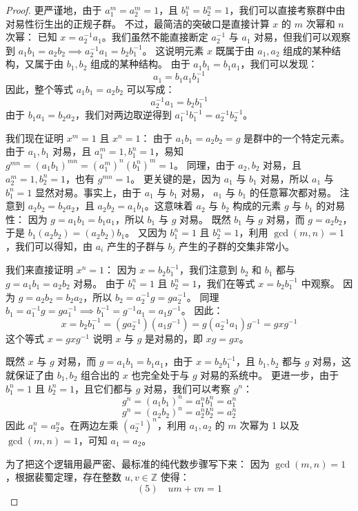 \documentclass[]{article}
\begin{document}
\begin{proof}
更严谨地，由于 $a_1^m = a_2^m = 1$，且 $b_1^n = b_2^n = 1$，我们可以直接考察群中由对易性衍生出的正规子群。
不过，最简洁的突破口是直接计算 $x$ 的 $m$ 次幂和 $n$ 次幂：
已知 $x = a_2^{-1} a_1$。我们虽然不能直接断定 $a_2^{-1}$ 与 $a_1$ 对易，但我们可以观察到 $a_1 b_1 = a_2 b_2 \implies a_2^{-1} a_1 = b_2 b_1^{-1}$。
这说明元素 $x$ 既属于由 $a_1, a_2$ 组成的某种结构，又属于由 $b_1, b_2$ 组成的某种结构。
由于 $a_1 b_1 = b_1 a_1$，我们可以发现：
\[ a_1 = b_1 a_1 b_1^{-1} \]
因此，整个等式 $a_1 b_1 = a_2 b_2$ 可以写成：
\[ a_2^{-1} a_1 = b_2 b_1^{-1} \]
由于 $b_1 a_1 = b_2 a_2$，我们对两边取逆得到 $a_1^{-1} b_1^{-1} = a_2^{-1} b_2^{-1}$。

我们现在证明 $x^m = 1$ 且 $x^n = 1$：
由于 $a_1 b_1 = a_2 b_2 = g$ 是群中的一个特定元素。由于 $a_1, b_1$ 对易，且 $a_1^m = 1, b_1^n = 1$，易知 $g^{mn} = (a_1 b_1)^{mn} = (a_1^m)^n (b_1^n)^m = 1$。
同理，由于 $a_2, b_2$ 对易，且 $a_2^m = 1, b_2^n = 1$，也有 $g^{mn} = 1$。
更关键的是，因为 $a_1$ 与 $b_1$ 对易，所以 $a_1$ 与 $b_1^n = 1$ 显然对易。事实上，由于 $a_1$ 与 $b_1$ 对易， $a_1$ 与 $b_1$ 的任意幂次都对易。
注意到 $a_2 b_2 = b_2 a_2$，且 $a_2 b_2 = a_1 b_1$。这意味着 $a_2$ 与 $b_2$ 构成的元素 $g$ 与 $b_1$ 的对易性：
因为 $g = a_1 b_1 = b_1 a_1$，所以 $b_1$ 与 $g$ 对易。
既然 $b_1$ 与 $g$ 对易，而 $g = a_2 b_2$，于是 $b_1 (a_2 b_2) = (a_2 b_2) b_1$。
又因为 $b_1^n = 1$ 且 $b_2^n = 1$，利用 $\gcd(m,n)=1$，我们可以得知，由 $a_i$ 产生的子群与 $b_j$ 产生的子群的交集非常小。

我们来直接证明 $x^n = 1$：
因为 $x = b_2 b_1^{-1}$，我们注意到 $b_2$ 和 $b_1$ 都与 $g = a_1 b_1 = a_2 b_2$ 对易。
由于 $b_1^n = 1$ 且 $b_2^n = 1$，我们在等式 $x = b_2 b_1^{-1}$ 中观察。
因为 $g = a_2 b_2 = b_2 a_2$，所以 $b_2 = a_2^{-1} g = g a_2^{-1}$。
同理 $b_1 = a_1^{-1} g = g a_1^{-1} \implies b_1^{-1} = g^{-1} a_1 = a_1 g^{-1}$。
因此：
\[ x = b_2 b_1^{-1} = (g a_2^{-1}) (a_1 g^{-1}) = g (a_2^{-1} a_1) g^{-1} = g x g^{-1} \]
这个等式 $x = g x g^{-1}$ 说明 $x$ 与 $g$ 是对易的，即 $x g = g x$。

既然 $x$ 与 $g$ 对易，而 $g = a_1 b_1 = b_1 a_1$，由于 $x = b_2 b_1^{-1}$，且 $b_1, b_2$ 都与 $g$ 对易，这就保证了由 $b_1, b_2$ 组合出的 $x$ 也完全处于与 $g$ 对易的系统中。
更进一步，由于 $b_1^n = 1$ 且 $b_2^n = 1$，且它们都与 $g$ 对易，我们可以考察 $g^n$：
\[ g^n = (a_1 b_1)^n = a_1^n b_1^n = a_1^n \]
\[ g^n = (a_2 b_2)^n = a_2^n b_2^n = a_2^n \]
因此 $a_1^n = a_2^n$。在两边左乘 $(a_2^{-1})^n$，利用 $a_1, a_2$ 的 $m$ 次幂为 1 以及 $\gcd(m,n)=1$，可知 $a_1 = a_2$。

为了把这个逻辑用最严密、最标准的纯代数步骤写下来：
因为 $\gcd(m, n) = 1$，根据裴蜀定理，存在整数 $u, v \in \mathbb{Z}$ 使得：
\[ (5) \quad um + vn = 1 \]


\end{proof}
\end{document}
